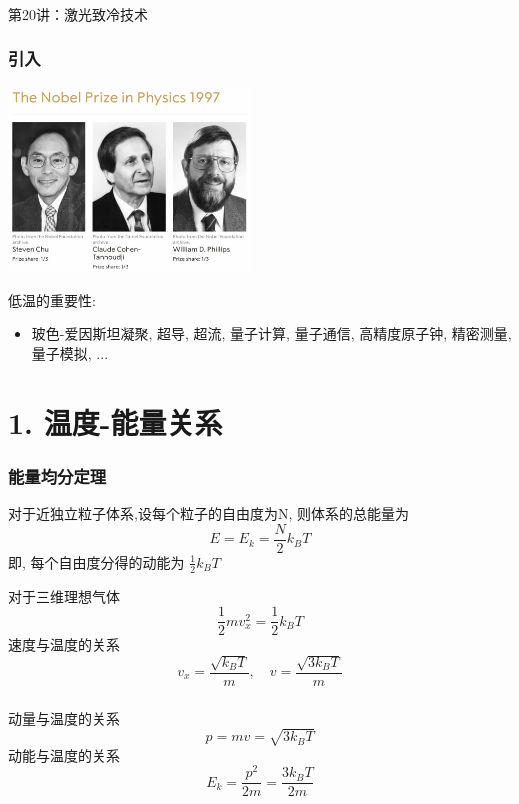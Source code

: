 
\begin{frame} [plain]
    \frametitle{}
    \Background[1] 
    \begin{center}
    {\huge 第20讲：激光致冷技术}
    \end{center}  
    \addtocounter{framenumber}{-1}   
\end{frame}

\begin{frame} 
\frametitle{引入}
  \begin{center}
       \includegraphics[width=0.48\textwidth]{figs/2022-05-27-23-18-37.png}
  \end{center}
低温的重要性: 
\begin{itemize}
    \item 玻色-爱因斯坦凝聚, 超导, 超流, 量子计算, 量子通信, 高精度原子钟, 精密测量, 量子模拟, ...
\end{itemize}
\end{frame}

\section{1. 温度-能量关系}

\begin{frame} 
\frametitle{能量均分定理}
对于近独立粒子体系,设每个粒子的自由度为N, 则体系的总能量为
\[ E=E_k= \frac{N}{2} k_B T\]
即, 每个自由度分得的动能为 $\frac{1}{2} k_B T$ \\ {\vspace*{1.3em}}

对于三维理想气体
\[ \frac{1}{2} m v_x ^2 = \frac{1}{2} k_B T\]
速度与温度的关系
\[ v_x = \frac{\sqrt{k_B T}}{m}, \quad v = \frac{\sqrt{3 k_B T}}{m} \]
\end{frame}

\begin{frame} 
\frametitle{}
 动量与温度的关系 
 \[ p=mv =\sqrt{3 k_B T}\]
 动能与温度的关系 
 \[E_k=\frac{p^2}{2m} = \frac{3 k_B T}{2m}\]
\end{frame}

